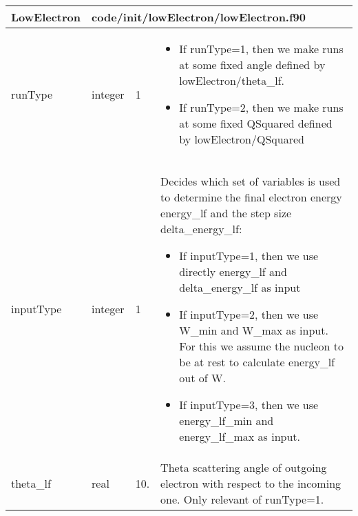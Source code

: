 \documentclass{article}
\begin{document}

\begin{longtable}{llll}
\toprule
\textbf{\large{LowElectron}} & \multicolumn{3}{l}{\footnotesize{code/init/lowElectron/lowElectron.f90}}\\*
\midrule
\endfirsthead
\midrule
\endhead
runType & \begin{minipage}[t]{2cm}integer\end{minipage} & \begin{minipage}[t]{2cm}1\end{minipage} & \begin{minipage}[t]{12cm}\begin{itemize}\leftmargin0em\itemindent0pt\item If runType=1, then we make runs at some fixed angle defined by lowElectron/theta\_lf.\item If runType=2, then we make runs at some fixed QSquared defined by lowElectron/QSquared\end{itemize}\end{minipage}\\*
\midrule
inputType & \begin{minipage}[t]{2cm}integer\end{minipage} & \begin{minipage}[t]{2cm}1\end{minipage} & \begin{minipage}[t]{12cm}Decides which set of variables is used to determine the final electron energy energy\_lf and the step size delta\_energy\_lf:\begin{itemize}\leftmargin0em\itemindent0pt\item If inputType=1, then we use directly energy\_lf and delta\_energy\_lf as input\item If inputType=2, then we use W\_min and W\_max as input. For this we assume the   nucleon to be at rest to calculate energy\_lf out of W.\item If inputType=3, then we use energy\_lf\_min and energy\_lf\_max as input.\end{itemize}\end{minipage}\\*
\midrule
theta\_lf & \begin{minipage}[t]{2cm}real\end{minipage} & \begin{minipage}[t]{2cm}10.\end{minipage} & \begin{minipage}[t]{12cm}Theta scattering angle of outgoing electron with respect to the incoming one. Only relevant of runType=1.\end{minipage}\\*

\end{longtable}
\end{document}
